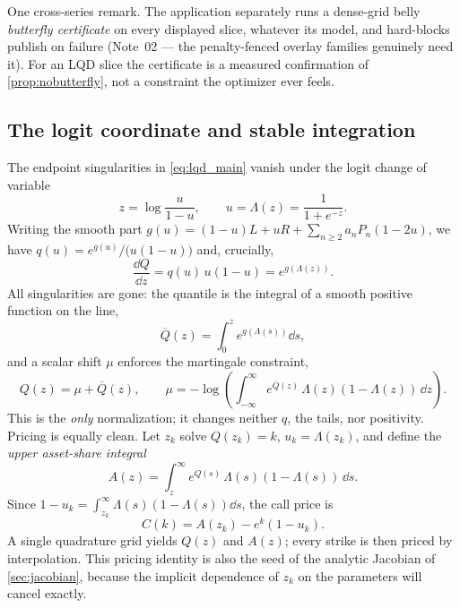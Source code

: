 \documentclass[11pt]{article}
\begin{document}
One cross-series remark. The application separately runs a dense-grid belly
\emph{butterfly certificate} on every displayed slice, whatever its model,
and hard-blocks publish on failure (Note~02 --- the penalty-fenced overlay
families genuinely need it). For an LQD slice the certificate is a measured
confirmation of \cref{prop:nobutterfly}, not a constraint the optimizer ever
feels.

\subsection{The logit coordinate and stable integration}
\label{sec:logit}

The endpoint singularities in \eqref{eq:lqd_main} vanish under the logit change
of variable
\begin{equation}
z=\log\frac{u}{1-u},\qquad u=\Lambda(z)=\frac{1}{1+e^{-z}}.
\end{equation}
Writing the smooth part
$g(u)=(1-u)L+uR+\sum_{n\ge2}a_nP_n(1-2u)$, we have
$q(u)=e^{g(u)}/\big(u(1-u)\big)$ and, crucially,
\begin{equation}
\frac{\dd Q}{\dd z}=q(u)\,u(1-u)=e^{g(\Lambda(z))}.
\label{eq:q_logit}
\end{equation}
All singularities are gone: the quantile is the integral of a smooth positive
function on the line,
\begin{equation}
\overline Q(z)=\int_0^z e^{g(\Lambda(s))}\dd s,
\label{eq:qbar}
\end{equation}
and a scalar shift $\mu$ enforces the martingale constraint,
\begin{equation}
Q(z)=\mu+\overline Q(z),\qquad
\mu=-\log\!\left(\int_{-\infty}^{\infty} e^{\overline Q(z)}\,\Lambda(z)(1-\Lambda(z))\,\dd z\right).
\label{eq:mu_norm}
\end{equation}
This is the \emph{only} normalization; it changes neither $q$, the tails, nor
positivity. Pricing is equally clean. Let $z_k$ solve $Q(z_k)=k$,
$u_k=\Lambda(z_k)$, and define the \emph{upper asset-share integral}
\begin{equation}
A(z)=\int_z^{\infty}e^{Q(s)}\,\Lambda(s)(1-\Lambda(s))\,\dd s.
\label{eq:asset_share}
\end{equation}
Since $1-u_k=\int_{z_k}^{\infty}\Lambda(s)(1-\Lambda(s))\dd s$, the call price is
\begin{equation}
C(k)=A(z_k)-e^{k}(1-u_k).
\label{eq:call_logit}
\end{equation}
A single quadrature grid yields $Q(z)$ and $A(z)$; every strike is then priced by
interpolation. This pricing identity is also the seed of the analytic Jacobian
of \cref{sec:jacobian}, because the implicit dependence of $z_k$ on the
parameters will cancel exactly.
\end{document}

